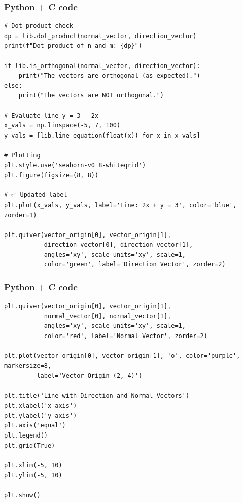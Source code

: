 \documentclass{beamer}
\begin{document}
\begin{frame}[fragile]
    \frametitle{Python + C code}

    \begin{lstlisting}
# Dot product check
dp = lib.dot_product(normal_vector, direction_vector)
print(f"Dot product of n and m: {dp}")

if lib.is_orthogonal(normal_vector, direction_vector):
    print("The vectors are orthogonal (as expected).")
else:
    print("The vectors are NOT orthogonal.")

# Evaluate line y = 3 - 2x
x_vals = np.linspace(-5, 7, 100)
y_vals = [lib.line_equation(float(x)) for x in x_vals]

# Plotting
plt.style.use('seaborn-v0_8-whitegrid')
plt.figure(figsize=(8, 8))

# ✅ Updated label
plt.plot(x_vals, y_vals, label='Line: 2x + y = 3', color='blue', zorder=1)

plt.quiver(vector_origin[0], vector_origin[1],
           direction_vector[0], direction_vector[1],
           angles='xy', scale_units='xy', scale=1,
           color='green', label='Direction Vector', zorder=2)
    \end{lstlisting}
\end{frame}
\begin{frame}[fragile]
    \frametitle{Python + C code}

    \begin{lstlisting}
plt.quiver(vector_origin[0], vector_origin[1],
           normal_vector[0], normal_vector[1],
           angles='xy', scale_units='xy', scale=1,
           color='red', label='Normal Vector', zorder=2)

plt.plot(vector_origin[0], vector_origin[1], 'o', color='purple', markersize=8,
         label='Vector Origin (2, 4)')

plt.title('Line with Direction and Normal Vectors')
plt.xlabel('x-axis')
plt.ylabel('y-axis')
plt.axis('equal')
plt.legend()
plt.grid(True)

plt.xlim(-5, 10)
plt.ylim(-5, 10)

plt.show()

    \end{lstlisting}
\end{frame}
\end{document}

